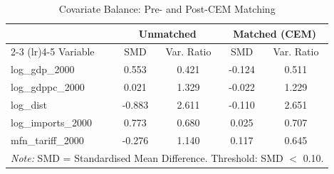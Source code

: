 \begin{table}[htbp]
\centering
\caption{Covariate Balance: Pre- and Post-CEM Matching}
\label{tab:cem_balance}
\small
\begin{tabular}{lcccc}
\hline\hline
& \multicolumn{2}{c}{Unmatched} & \multicolumn{2}{c}{Matched (CEM)} \\
\cmidrule(lr){2-3} \cmidrule(lr){4-5}
Variable & SMD & Var. Ratio & SMD & Var. Ratio \\
\hline
log\_gdp\_2000 & 0.553 & 0.421 & -0.124 & 0.511 \\
log\_gdppc\_2000 & 0.021 & 1.329 & -0.022 & 1.229 \\
log\_dist & -0.883 & 2.611 & -0.110 & 2.651 \\
log\_imports\_2000 & 0.773 & 0.680 & 0.025 & 0.707 \\
mfn\_tariff\_2000 & -0.276 & 1.140 & 0.117 & 0.645 \\
\hline\hline
\multicolumn{5}{l}{\footnotesize \textit{Note:} SMD = Standardised Mean Difference. Threshold: SMD $<$ 0.10.} \\
\end{tabular}
\end{table}
